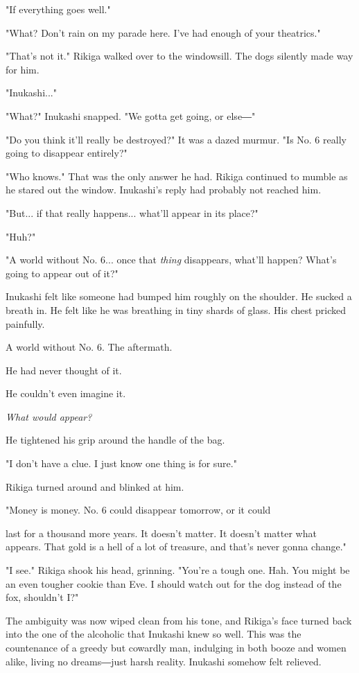 "If everything goes well."

"What? Don't rain on my parade here. I've had enough of your theatrics."

"That's not it." Rikiga walked over to the windowsill. The dogs silently
made way for him.

"Inukashi..."

"What?" Inukashi snapped. "We gotta get going, or else―"

"Do you think it'll really be destroyed?" It was a dazed murmur. "Is No.
6 really going to disappear entirely?"

"Who knows." That was the only answer he had. Rikiga continued to mumble
as he stared out the window. Inukashi's reply had probably not reached
him.

"But... if that really happens... what'll appear in its place?"

"Huh?"

"A world without No. 6... once that \emph{thing} disappears, what'll happen?
What's going to appear out of it?"

Inukashi felt like someone had bumped him roughly on the shoulder. He
sucked a breath in. He felt like he was breathing in tiny shards of
glass. His chest pricked painfully.

A world without No. 6. The aftermath.

He had never thought of it.

He couldn't even imagine it.

\emph{What would appear?}

He tightened his grip around the handle of the bag.

"I don't have a clue. I just know one thing is for sure."

Rikiga turned around and blinked at him.

"Money is money. No. 6 could disappear tomorrow, or it could~

last for a thousand more years. It doesn't matter. It doesn't matter
what appears. That gold is a hell of a lot of treasure, and that's never
gonna change."

"I see." Rikiga shook his head, grinning. "You're a tough one. Hah. You
might be an even tougher cookie than Eve. I should watch out for the dog
instead of the fox, shouldn't I?"

The ambiguity was now wiped clean from his tone, and Rikiga's face
turned back into the one of the alcoholic that Inukashi knew so well.
This was the countenance of a greedy but cowardly man, indulging in both
booze and women alike, living no dreams―just harsh reality. Inukashi
somehow felt relieved.

